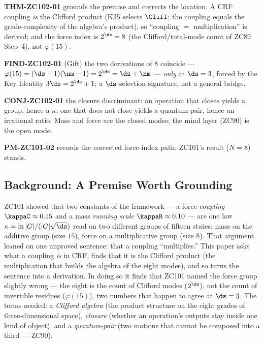 \documentclass[12pt, a4paper]{article}
\begin{document}
\textbf{THM-ZC102-01} grounds the premise and corrects the location. A CRF
coupling \emph{is} the Clifford product (K35 selects $\Cliff$; the coupling
equals the grade-complexity of the algebra's product), so ``coupling
$=$ multiplication'' is derived; and the force index is $2^{\ds}=8$ (the
Clifford/total-mode count of ZC89 Step~4), not $\varphi(15)$.

\textbf{FIND-ZC102-01} (Gift) the two derivations of $8$ coincide ---
$\varphi(15)=(\ds-1)(\nm-1)=2^{\ds}=\ds+\nm$ --- \emph{only} at $\ds=3$, forced by
the Key Identity $3\ds=2^{\ds}+1$; a $\ds$-selection signature, not a general
bridge.

\textbf{CONJ-ZC102-01} the closure discriminant: an operation that closes yields
a group, hence a $\kappa$; one that does not close yields a quantum-pair, hence
an irrational ratio. Mass and force are the closed modes; the mind layer
(ZC90) is the open mode.

\textbf{PM-ZC101-02} records the corrected force-index path; ZC101's result
($N=8$) stands.


\subsection{Background: A Premise Worth Grounding}
\label{sec:background-zc102}

ZC101 showed that two constants of the framework --- a force \emph{coupling}
$\kappaC\approx0.15$ and a mass \emph{running scale} $\kappaR\approx0.10$ --- are
one law $\kappa=\ln|G|/(|G|\sqrt{\ds})$ read on two different groups of fifteen
states: mass on the additive group (size $15$), force on a multiplicative group
(size $8$). That argument leaned on one unproved sentence: that a coupling
``multiplies.'' This paper asks what a coupling \emph{is} in CRF, finds that it
is the Clifford product (the multiplication that builds the algebra of the eight
modes), and so turns the sentence into a derivation. In doing so it finds that
ZC101 named the force group slightly wrong --- the eight is the count of Clifford
modes ($2^{\ds}$), not the count of invertible residues ($\varphi(15)$), two
numbers that happen to agree at $\ds=3$. The terms needed: a \emph{Clifford
algebra} (the product structure on the eight grades of three-dimensional space),
\emph{closure} (whether an operation's outputs stay inside one kind of object),
and a \emph{quantum-pair} (two motions that cannot be composed into a third ---
ZC90).
\end{document}
